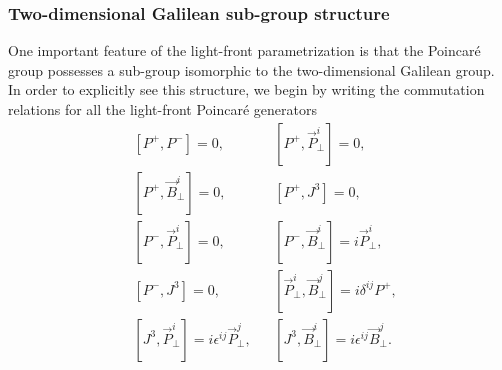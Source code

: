 \subsubsection*{\sffamily Two-dimensional Galilean sub-group structure}
One important feature of the light-front parametrization is that the Poincar\'e group possesses a sub-group isomorphic to the two-dimensional Galilean group. In order to explicitly see this structure, we begin by writing the commutation relations for all the light-front Poincar\'e generators
\begin{equation}
\label{lc4}
\begin{aligned}
&[P^+,P^-]=0, && [P^+,\vec{P}_\perp^i]=0,\\
&[P^+,\vec{B}_\perp^i]=0, && [P^+,J^3]=0, \\
&[P^-,\vec{P}_\perp^i]=0, && [P^-,\vec{B}_\perp^i]=i\vec{P}_\perp^i,\\
&[P^-,J^3]=0, && [\vec{P}_\perp^i,\vec{B}_\perp^j]=i\delta^{ij}P^+,\\
&[J^3,\vec{P}_\perp^i]=i\epsilon^{ij}\vec{P}_\perp^j, &&[J^3,\vec{B}_\perp^i]=i\epsilon^{ij}\vec{B}_\perp^j.
\end{aligned}
\end{equation}

